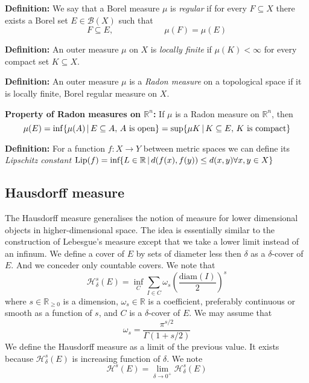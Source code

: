 \documentclass{article}
\begin{document}
\vspace{2ex}
\textbf{Definition:} We say that a Borel measure $\mu$ is \emph{regular} if
for every $F\subseteq X$ there exists a Borel set $E\in\mathcal B(X)$ such that
\[F\subseteq E,\quad\quad\quad\quad\quad\quad\mu(F)=\mu(E)\]

\vspace{2ex}
\textbf{Definition:} An outer measure $\mu$ on $X$ is \emph{locally finite} if
$\mu(K)<\infty$ for every compact set $K\subseteq X$.

\vspace{2ex}
\textbf{Definition:} An outer measure $\mu$ is a \emph{Radon measure} on a
topological space if it is locally finite, Borel regular measure on $X$.

\vspace{2ex}
\textbf{Property of Radon measures on $\mathbb{R}^n$:} If $\mu$ is a Radon
measure on $\mathbb{R}^n$, then
\[
    \mu(E)=\inf\{\mu(A)\,|\,E\subseteq A,\,A\textnormal{ is open}\}
          =\sup\{\mu{K}\,|\,K\subseteq E,\,K\textnormal{ is compact}\}
\]

\vspace{2ex}
\textbf{Definition:} For a function $f:X\rightarrow Y$ between metric spaces we can
define its \emph{Lipschitz constant} $\text{Lip}(f) = \textnormal{inf}\{L\in
\mathbb{R}\,|\,d(f(x),f(y))\leq d(x,y) \forall x,y\in X\}$

\subsection{Hausdorff measure}
The Hausdorff measure generalises the notion of measure for lower dimensional
objects in higher-dimensional space. The idea is essentially similar to the
construction of Lebesgue's measure except that we take a lower limit instead of
an infinum. We define a cover of $E$ by sets of diameter less then $\delta$ as
a $\delta$-cover of $E$. And we conceder only countable covers. We note that
\[\mathcal{H}_\delta^s(E)=\inf_{C}\sum_{I\in C}\omega_s\left(\frac{\text{diam}(I)}{2}\right)^s\]
where $s\in\mathbb{R}_{\geq 0}$ is a dimension, $\omega_s\in\mathbb{R}$ is a
coefficient, preferably continuous or smooth as a function of $s$, and $C$ is a
$\delta$-cover of $E$. We may assume that
\[\omega_s = \frac{\pi^{s/2}}{\Gamma(1+s/2)}\]
We define the Hausdorff measure as a limit of the previous value. It exists
because $\mathcal{H}_\delta^s(E)$ is increasing function of $\delta$. We note
\[\mathcal{H}^s(E)=\lim_{\delta\rightarrow0^+}\mathcal{H}^s_\delta(E)\]
\end{document}
